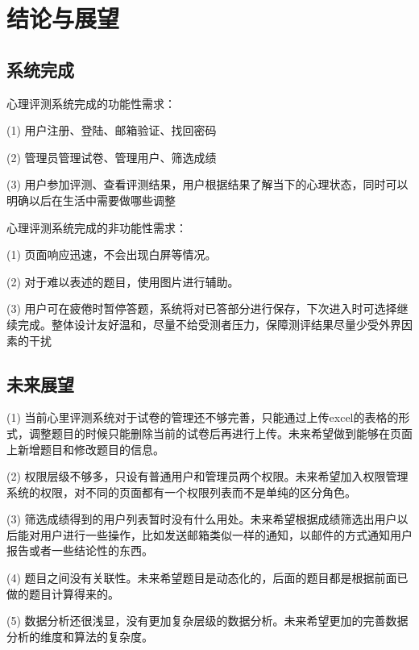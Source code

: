 \section{结论与展望}

\subsection{系统完成}

心理评测系统完成的功能性需求：

(1) 用户注册、登陆、邮箱验证、找回密码

(2) 管理员管理试卷、管理用户、筛选成绩

(3) 用户参加评测、查看评测结果，用户根据结果了解当下的心理状态，同时可以明确以后在生活中需要做哪些调整

心理评测系统完成的非功能性需求：

(1) 页面响应迅速，不会出现白屏等情况。

(2) 对于难以表述的题目，使用图片进行辅助。

(3) 用户可在疲倦时暂停答题，系统将对已答部分进行保存，下次进入时可选择继续完成。整体设计友好温和，尽量不给受测者压力，保障测评结果尽量少受外界因素的干扰

\subsection{未来展望}

(1) 当前心里评测系统对于试卷的管理还不够完善，只能通过上传excel的表格的形式，调整题目的时候只能删除当前的试卷后再进行上传。未来希望做到能够在页面上新增题目和修改题目的信息。

(2) 权限层级不够多，只设有普通用户和管理员两个权限。未来希望加入权限管理系统的权限，对不同的页面都有一个权限列表而不是单纯的区分角色。

(3) 筛选成绩得到的用户列表暂时没有什么用处。未来希望根据成绩筛选出用户以后能对用户进行一些操作，比如发送邮箱类似一样的通知，以邮件的方式通知用户报告或者一些结论性的东西。

(4) 题目之间没有关联性。未来希望题目是动态化的，后面的题目都是根据前面已做的题目计算得来的。

(5) 数据分析还很浅显，没有更加复杂层级的数据分析。未来希望更加的完善数据分析的维度和算法的复杂度。
